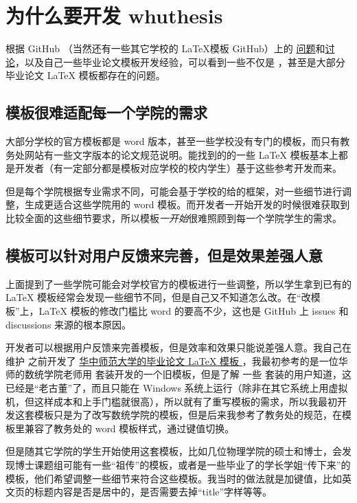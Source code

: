 \section{为什么要开发 whuthesis}

根据  GitHub （当然还有一些其它学校的 \LaTeX 模板 GitHub）上的 \href{https://github.com/whutug/whu-thesis/issues}{问题}和\href{https://github.com/whutug/whu-thesis/discussions}{讨论}，以及自己一些毕业论文模板开发经验，可以看到一些不仅是 ，甚至是大部分毕业论文 \LaTeX{} 模板都存在的问题。


\subsection{模板很难适配每一个学院的需求}

大部分学校的官方模板都是 word 版本，甚至一些学校没有专门的模板，而只有教务处网站有一些文字版本的论文规范说明。能找到的的一些 \LaTeX{} 模板基本上都是开发者（有一定部分都是模板对应学校的校内学生）基于这些参考开发而来。
  
但是每个学院根据专业需求不同，可能会基于学校的给的框架，对一些细节进行调整，生成更适合这些学院用的 word 模板。而开发者一开始开发的时候很难获取到比较全面的这些细节要求，所以模板\emph{一开始}很难照顾到每一个学院学生的需求。


\subsection{模板可以针对用户反馈来完善，但是效果差强人意}

上面提到了一些学院可能会对学校官方的模板进行一些调整，所以学生拿到已有的 \LaTeX{} 模板经常会发现一些细节不同，但是自己又不知道怎么改。在“改模板”上，\LaTeX{} 模板的修改门槛比 word 的要高不少，这也是 GitHub 上 issues 和 discussions 来源的根本原因。

开发者可以根据用户反馈来完善模板，但是效率和效果只能说差强人意。我自己在维护  之前开发了 \href{https://github.com/xkwxdyy/CCNUthesis}{华中师范大学的毕业论文 \LaTeX{} 模板 }，我最初参考的是一位华师的数统学院老师用 \CTeX 套装开发的一个旧模板，但是了解 一些 \CTeX 套装的用户知道，这已经是“老古董”了，而且只能在 Windows 系统上运行（除非在其它系统上用虚拟机，但这样成本和上手门槛就很高），所以就有了重写模板的需求，所以我最初开发这套模板只是为了改写数统学院的模板，但是后来我参考了教务处的规范，在模板里兼容了教务处的 word 模板样式，通过键值切换。

但是随其它学院的学生开始使用这套模板，比如几位物理学院的硕士和博士，会发现博士课题组可能有一些“祖传”的模板，或者是一些毕业了的学长学姐“传下来”的模板，他们希望调整一些细节来符合这些模板。我当时的做法就是加键值，比如英文页的标题内容是否是居中的，是否需要去掉“title”字样等等。

